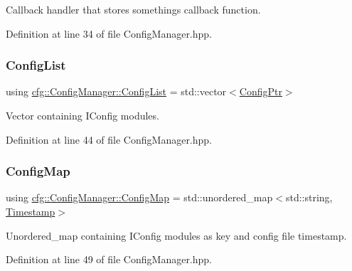 Callback handler that stores something\textquotesingle{}s callback function. 



Definition at line 34 of file Config\+Manager.\+hpp.

\mbox{\label{classcfg_1_1_config_manager_a94ed7fb2c98c2584e0f98326bf65c98f}} 
\subsubsection{\texorpdfstring{Config\+List}{ConfigList}}
{\footnotesize\ttfamily using \hyperlink{classcfg_1_1_config_manager_a94ed7fb2c98c2584e0f98326bf65c98f}{cfg\+::\+Config\+Manager\+::\+Config\+List} =  std\+::vector$<$\hyperlink{namespacecfg_af5f3a3fc2010c76e90bc66696485989f}{Config\+Ptr}$>$}



Vector containing I\+Config modules. 



Definition at line 44 of file Config\+Manager.\+hpp.

\mbox{\label{classcfg_1_1_config_manager_ac50f6c213e2646aa1c261c431b6fe351}} 
\subsubsection{\texorpdfstring{Config\+Map}{ConfigMap}}
{\footnotesize\ttfamily using \hyperlink{classcfg_1_1_config_manager_ac50f6c213e2646aa1c261c431b6fe351}{cfg\+::\+Config\+Manager\+::\+Config\+Map} =  std\+::unordered\+\_\+map$<$std\+::string, \hyperlink{namespacecfg_aa17d58439174a5af7fb3f37a3cdd6d0b}{Timestamp}$>$}



Unordered\+\_\+map containing I\+Config modules as key and config file timestamp. 



Definition at line 49 of file Config\+Manager.\+hpp.

\mbox{\label{classcfg_1_1_config_manager_abb7d9a63860843839fa4d8f339f0122b}} 
